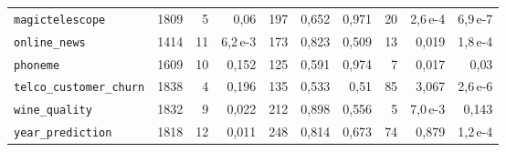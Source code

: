 \begin{table}[htbp]
\begin{tabular}{lrrrrrrrrr}
\texttt{magictelescope} & 1809 & 5 & 0{,}06 & 197 & 0{,}652 & 0{,}971 & 20 & 2{,}6\,e-4 & 6{,}9\,e-7 \\
\texttt{online\_news} & 1414 & 11 & 6{,}2\,e-3 & 173 & 0{,}823 & 0{,}509 & 13 & 0{,}019 & 1{,}8\,e-4 \\
\texttt{phoneme} & 1609 & 10 & 0{,}152 & 125 & 0{,}591 & 0{,}974 & 7 & 0{,}017 & 0{,}03 \\
\texttt{telco\_\allowbreak customer\_\allowbreak churn} & 1838 & 4 & 0{,}196 & 135 & 0{,}533 & 0{,}51 & 85 & 3{,}067 & 2{,}6\,e-6 \\
\texttt{wine\_quality} & 1832 & 9 & 0{,}022 & 212 & 0{,}898 & 0{,}556 & 5 & 7{,}0\,e-3 & 0{,}143 \\
\texttt{year\_\allowbreak prediction} & 1818 & 12 & 0{,}011 & 248 & 0{,}814 & 0{,}673 & 74 & 0{,}879 & 1{,}2\,e-4 \\
\bottomrule
\end{tabular}
\end{table}

